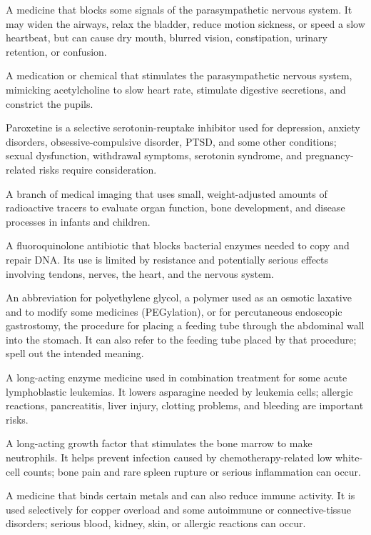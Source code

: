  A medicine that blocks some signals of the parasympathetic nervous system. It may widen the airways, relax the bladder, reduce motion sickness, or speed a slow heartbeat, but can cause dry mouth, blurred vision, constipation, urinary retention, or confusion.

 A medication or chemical that stimulates the parasympathetic nervous system, mimicking acetylcholine to slow heart rate, stimulate digestive secretions, and constrict the pupils.

 Paroxetine is a selective serotonin-reuptake inhibitor used for depression, anxiety disorders, obsessive-compulsive disorder, PTSD, and some other conditions; sexual dysfunction, withdrawal symptoms, serotonin syndrome, and pregnancy-related risks require consideration.

 A branch of medical imaging that uses small, weight-adjusted amounts of radioactive tracers to evaluate organ function, bone development, and disease processes in infants and children.

 A fluoroquinolone antibiotic that blocks bacterial enzymes needed to copy and repair DNA. Its use is limited by resistance and potentially serious effects involving tendons, nerves, the heart, and the nervous system.

 An abbreviation for polyethylene glycol, a polymer used as an osmotic laxative and to modify some medicines (PEGylation), or for percutaneous endoscopic gastrostomy, the procedure for placing a feeding tube through the abdominal wall into the stomach. It can also refer to the feeding tube placed by that procedure; spell out the intended meaning.


 A long-acting enzyme medicine used in combination treatment for some acute lymphoblastic leukemias. It lowers asparagine needed by leukemia cells; allergic reactions, pancreatitis, liver injury, clotting problems, and bleeding are important risks.

 A long-acting growth factor that stimulates the bone marrow to make neutrophils. It helps prevent infection caused by chemotherapy-related low white-cell counts; bone pain and rare spleen rupture or serious inflammation can occur.

 A medicine that binds certain metals and can also reduce immune activity. It is used selectively for copper overload and some autoimmune or connective-tissue disorders; serious blood, kidney, skin, or allergic reactions can occur.

